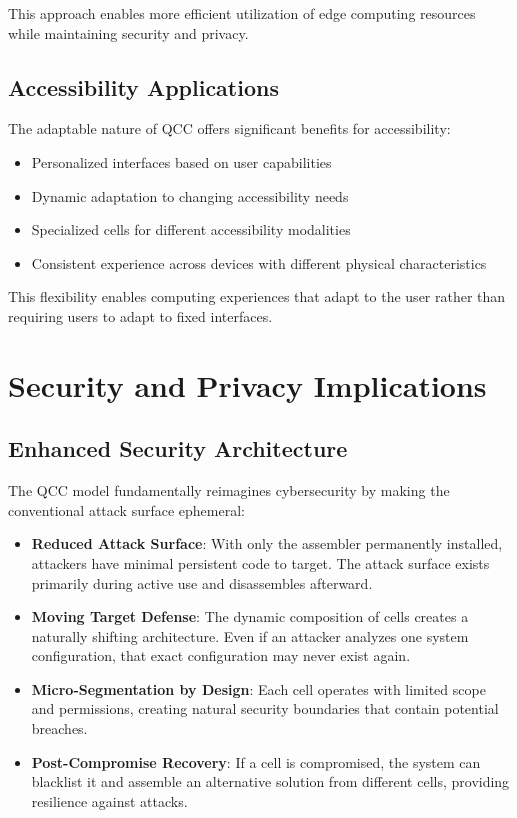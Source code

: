\documentclass[11pt,a4paper]{article}
\begin{document}
This approach enables more efficient utilization of edge computing resources while maintaining security and privacy.

\subsection{Accessibility Applications}

The adaptable nature of QCC offers significant benefits for accessibility:

\begin{itemize}
    \item Personalized interfaces based on user capabilities
    \item Dynamic adaptation to changing accessibility needs
    \item Specialized cells for different accessibility modalities
    \item Consistent experience across devices with different physical characteristics
\end{itemize}

This flexibility enables computing experiences that adapt to the user rather than requiring users to adapt to fixed interfaces.

\section{Security and Privacy Implications}

\subsection{Enhanced Security Architecture}

The QCC model fundamentally reimagines cybersecurity by making the conventional attack surface ephemeral:

\begin{itemize}
    \item \textbf{Reduced Attack Surface}: With only the assembler permanently installed, attackers have minimal persistent code to target. The attack surface exists primarily during active use and disassembles afterward.
    
    \item \textbf{Moving Target Defense}: The dynamic composition of cells creates a naturally shifting architecture. Even if an attacker analyzes one system configuration, that exact configuration may never exist again.
    
    \item \textbf{Micro-Segmentation by Design}: Each cell operates with limited scope and permissions, creating natural security boundaries that contain potential breaches.
    
    \item \textbf{Post-Compromise Recovery}: If a cell is compromised, the system can blacklist it and assemble an alternative solution from different cells, providing resilience against attacks.
\end{itemize}
\end{document}
